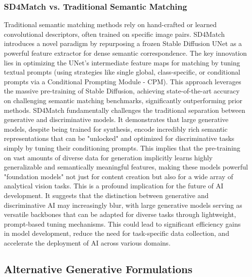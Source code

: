 \documentclass[a4paper]{article}
\begin{document}
\subsubsection*{SD4Match vs. Traditional Semantic Matching}
Traditional semantic matching methods rely on hand-crafted or learned convolutional descriptors, often trained on specific image pairs. SD4Match \cite{Li2023SD4Match} introduces a novel paradigm by repurposing a frozen Stable Diffusion UNet as a powerful feature extractor for dense semantic correspondence. The key innovation lies in optimizing the UNet's intermediate feature maps for matching by tuning textual prompts (using strategies like single global, class-specific, or conditional prompts via a Conditional Prompting Module - CPM). This approach leverages the massive pre-training of Stable Diffusion, achieving state-of-the-art accuracy on challenging semantic matching benchmarks, significantly outperforming prior methods. SD4Match fundamentally challenges the traditional separation between generative and discriminative models. It demonstrates that large generative models, despite being trained for synthesis, encode incredibly rich semantic representations that can be "unlocked" and optimized for discriminative tasks simply by tuning their conditioning prompts. This implies that the pre-training on vast amounts of diverse data for generation implicitly learns highly generalizable and semantically meaningful features, making these models powerful "foundation models" not just for content creation but also for a wide array of analytical vision tasks. This is a profound implication for the future of AI development. It suggests that the distinction between generative and discriminative AI may increasingly blur, with large generative models serving as versatile backbones that can be adapted for diverse tasks through lightweight, prompt-based tuning mechanisms. This could lead to significant efficiency gains in model development, reduce the need for task-specific data collection, and accelerate the deployment of AI across various domains.

\subsection{Alternative Generative Formulations}
\end{document}
